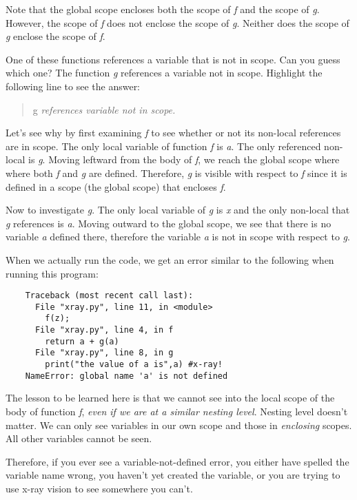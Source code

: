 Note that the global scope encloses both the scope of {\it f} and
the scope of {\it g}. However, the scope of {\it f} does
not enclose the scope of {\it g}. Neither does
the scope of {\it g} enclose the scope of {\it f}.

One of these functions references a variable that is not in scope.
Can you guess which one?
\T The function {\it g} references a  variable not in scope.
\W Highlight the following line to see the answer:

\W\begin{quote}
 {\color{white} g} {\it references variable not in scope.}
\W\end{quote}

Let's see why by first examining {\it f} to see whether or
not its non-local references are in scope.
The only local variable of function {\it f} is
{\it a}. The only referenced non-local is {\it g}.
Moving leftward from the body of {\it f}, we reach the
global scope where where both {\it f} and {\it g} are defined.
Therefore, {\it g}
is visible with respect to {\it f} since it is defined in a scope
(the global scope) that encloses {\it f}.

Now to investigate {\it g}. The only local variable of
{\it g} is {\it x}
and the only non-local that {\it g} references is {\it a}.
Moving outward to the global scope, we see that there is
no variable {\it a} defined there,
therefore the variable {\it a} is not in scope with
respect to {\it g}.

When we actually run the code,
we get an error similar to the following when running this program:

\begin{verbatim}
    Traceback (most recent call last):
      File "xray.py", line 11, in <module>
        f(z);
      File "xray.py", line 4, in f
        return a + g(a)
      File "xray.py", line 8, in g
        print("the value of a is",a) #x-ray!
    NameError: global name 'a' is not defined
\end{verbatim}

The lesson to be learned here is
that we cannot see into
the local scope of the body of function {\it f},
{\it even if we are at a similar nesting level}.
Nesting level doesn't matter. We can only see variables
in our own scope and those in {\it enclosing} scopes.
All other variables cannot be seen.

Therefore, if you ever see a variable-not-defined error,
you either have spelled the variable name wrong, you haven't
yet created the variable, or you are trying to use x-ray vision
to see somewhere you can't. 

